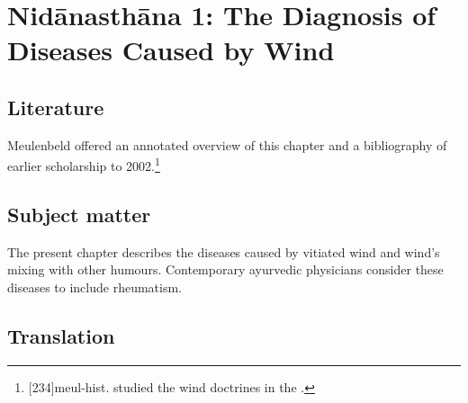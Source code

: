 
\chapter{Nidānasthāna 1: The Diagnosis of Diseases Caused 
by Wind}


\section{Literature}

Meulenbeld offered an annotated overview of this chapter and a
bibliography of earlier scholarship to 
2002.\footnote{[234]{meul-hist}. \citep{rube-1954b} studied the 
wind doctrines in the \CS.}


\section{Subject matter}

The present chapter describes the diseases caused by vitiated wind and
wind's mixing with other humours. Contemporary ayurvedic physicians 
consider these diseases to include rheumatism. 

\section{Translation}

